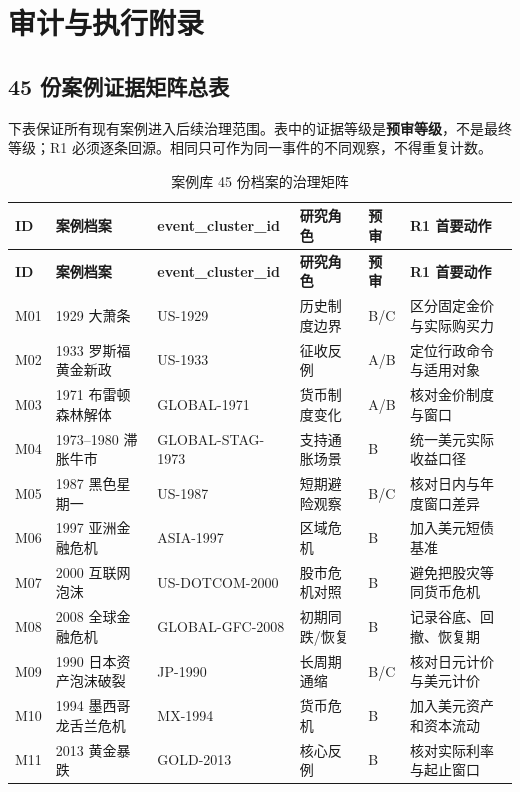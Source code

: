\documentclass[UTF8,12pt,openany]{ctexbook}
\begin{document}
\appendix
\part{审计与执行附录}

\chapter{45 份案例证据矩阵总表}
下表保证所有现有案例进入后续治理范围。表中的证据等级是\textbf{预审等级}，不是最终等级；R1 必须逐条回源。相同只可作为同一事件的不同观察，不得重复计数。

\begin{landscape}
\scriptsize
\begin{longtable}{p{1.1cm}p{5.1cm}p{3.0cm}p{3.0cm}p{2.0cm}p{4.0cm}}
\caption{案例库 45 份档案的治理矩阵}\label{tab:case-matrix}\\
\toprule
\textbf{ID} & \textbf{案例档案} & \textbf{event\_cluster\_id} & \textbf{研究角色} & \textbf{预审} & \textbf{R1 首要动作}\\
\midrule
\endfirsthead
\toprule
\textbf{ID} & \textbf{案例档案} & \textbf{event\_cluster\_id} & \textbf{研究角色} & \textbf{预审} & \textbf{R1 首要动作}\\
\midrule
\endhead
M01 & 1929 大萧条 & US-1929 & 历史制度边界 & B/C & 区分固定金价与实际购买力\\
M02 & 1933 罗斯福黄金新政 & US-1933 & 征收反例 & A/B & 定位行政命令与适用对象\\
M03 & 1971 布雷顿森林解体 & GLOBAL-1971 & 货币制度变化 & A/B & 核对金价制度与窗口\\
M04 & 1973--1980 滞胀牛市 & GLOBAL-STAG-1973 & 支持通胀场景 & B & 统一美元实际收益口径\\
M05 & 1987 黑色星期一 & US-1987 & 短期避险观察 & B/C & 核对日内与年度窗口差异\\
M06 & 1997 亚洲金融危机 & ASIA-1997 & 区域危机 & B & 加入美元短债基准\\
M07 & 2000 互联网泡沫 & US-DOTCOM-2000 & 股市危机对照 & B & 避免把股灾等同货币危机\\
M08 & 2008 全球金融危机 & GLOBAL-GFC-2008 & 初期同跌/恢复 & B & 记录谷底、回撤、恢复期\\
M09 & 1990 日本资产泡沫破裂 & JP-1990 & 长周期通缩 & B/C & 核对日元计价与美元计价\\
M10 & 1994 墨西哥龙舌兰危机 & MX-1994 & 货币危机 & B & 加入美元资产和资本流动\\
M11 & 2013 黄金暴跌 & GOLD-2013 & 核心反例 & B & 核对实际利率与起止窗口\\

\end{longtable}
\end{landscape}
\end{document}
